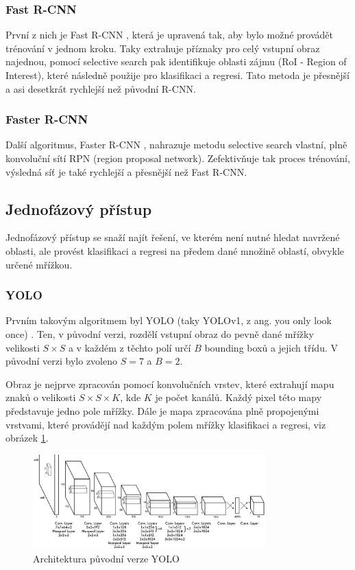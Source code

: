 \subsubsection{Fast R-CNN}
První z nich je Fast R-CNN \cite{fast-r-cnn}, která je upravená tak, aby bylo
možné provádět trénování v jednom kroku. Taky extrahuje příznaky pro celý
vstupní obraz najednou, pomocí selective search pak identifikuje oblasti zájmu
(RoI - Region of Interest), které následně použije pro klasifikaci a regresi.
Tato metoda je přesnější a asi desetkrát rychlejší než původní R-CNN.

\subsubsection{Faster R-CNN}
Další algoritmus, Faster R-CNN \cite{faster-r-cnn}, nahrazuje metodu selective
search vlastní, plně konvoluční sítí RPN (region proposal network).
Zefektivňuje tak proces trénování, výsledná síť je také rychlejší a přesnější
než Fast R-CNN.

\subsection{Jednofázový přístup}

Jednofázový přístup se snaží najít řešení, ve kterém není nutné hledat navržené
oblasti, ale provést klasifikaci a regresi na předem dané množině oblastí,
obvykle určené mřížkou.

\subsubsection{YOLO}
Prvním takovým algoritmem byl YOLO (taky YOLOv1, z ang. you only look once)
\cite{yolo}. Ten, v původní verzi, rozdělí vstupní obraz do pevně dané mřížky
velikosti $S \times S$ a v každém z těchto polí určí $B$ bounding boxů a jejich
třídu. V původní verzi bylo zvoleno $S = 7$ a $B = 2$.

Obraz je nejprve zpracován pomocí konvolučních vrstev, které extrahují mapu
znaků o velikosti $S \times S \times K$, kde $K$ je počet kanálů. Každý pixel
této mapy představuje jedno pole mřížky. Dále je mapa zpracována plně
propojenými vrstvami, které provádějí nad každým polem mřížky klasifikaci a
regresi, viz obrázek \ref{fig:yolo}.

\begin{figure}[]
    \centering
    \includegraphics[width=0.8\textwidth]{Figures/yolo}
    \caption{Architektura původní verze YOLO \cite{yolo}}
    \label{fig:yolo}
\end{figure}

